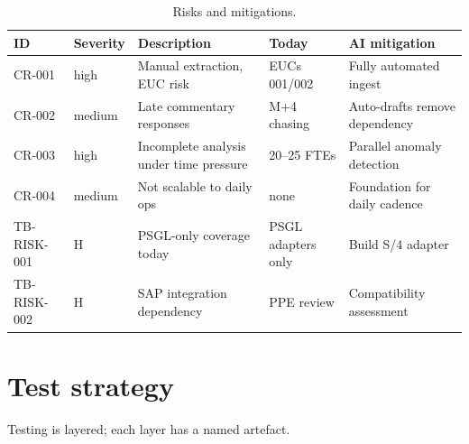 \documentclass[11pt,a4paper,twoside]{report}
\begin{document}
\begin{table}[htbp]
\caption{Risks and mitigations.}\label{tab:risks}
\centering
\footnotesize
\begin{tabularx}{\linewidth}{@{}llXlX@{}}
\toprule
\textbf{ID} & \textbf{Severity} & \textbf{Description} & \textbf{Today} & \textbf{AI mitigation} \\ \midrule
CR-001       & high     & Manual extraction, EUC risk       & EUCs 001/002 & Fully automated ingest \\
CR-002       & medium   & Late commentary responses         & M+4 chasing  & Auto-drafts remove dependency \\
CR-003       & high     & Incomplete analysis under time pressure & 20--25 FTEs  & Parallel anomaly detection \\
CR-004       & medium   & Not scalable to daily ops         & none         & Foundation for daily cadence \\
TB-RISK-001  & H        & PSGL-only coverage today          & PSGL adapters only & Build S/4 adapter \\
TB-RISK-002  & H        & SAP integration dependency        & PPE review   & Compatibility assessment \\
\bottomrule
\end{tabularx}
\end{table}

\section{Test strategy}

Testing is layered; each layer has a named artefact.
\end{document}
